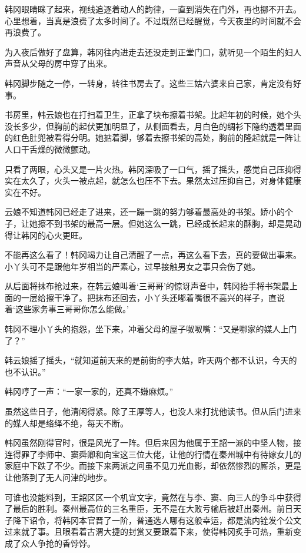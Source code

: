 韩冈眼睛眯了起来，视线追逐着动人的韵律，一直到消失在门外，再也挪不开去。心里想着，当真是浪费了太多时间了。不过既然已经醒觉，今天夜里的时间就不会再浪费了。

为入夜后做好了盘算，韩冈往内进走去还没走到正堂门口，就听见一个陌生的妇人声音从父母的房中穿了出来。

韩冈脚步随之一停，一转身，转往书房去了。这些三姑六婆来自己家，肯定没有好事。

书房里，韩云娘也在打扫着卫生，正拿了块布擦着书架。比起年初的时候，她个头没长多少，但胸前的起伏更加明显了，从侧面看去，月白色的绸衫下隐约透着里面的红色肚兜被看得分明。她掂着脚，够着去擦书架的高处，胸前的隆起就是一阵让人口干舌燥的微微颤动。

只看了两眼，心头又是一片火热。韩冈深吸了一口气，摇了摇头，感觉自己压抑得实在太久了，火头一被点起，就怎么也压不下去。果然太过压抑自己，对身体健康实在不好。

云娘不知道韩冈已经走了进来，还一蹦一跳的努力够着最高处的书架。娇小的个子，让她擦不到书架的最高一层。但她这么一跳，已经成长起来的酥胸，却是晃动得让韩冈的心火更旺。

不能再这么看了！韩冈竭力让自己清醒了一点，再这么看下去，真的要做出事来。小丫头可不是跟他年岁相当的严素心，过早接触男女之事只会伤了她。

从后面将抹布抢过来，在韩云娘叫着‘三哥哥’的惊讶声音中，韩冈抬手将书架最上面的一层给擦干净了。把抹布还回去，小丫头还嘟着嘴很不高兴的样子，直说着‘这些家务事三哥哥你怎么能做。’

韩冈不理小丫头的抱怨，坐下来，冲着父母的屋子呶呶嘴：“又是哪家的媒人上门了？”

韩云娘摇了摇头，“就知道前天来的是前街的李大姑，昨天两个都不认识，今天的也不认识。”

韩冈哼了一声：“一家一家的，还真不嫌麻烦。”

虽然这些日子，他清闲得紧。除了王厚等人，也没人来打扰他读书。但从后门进来的媒人却是络绎不绝，每天不断。

韩冈虽然刚得官时，很是风光了一阵。但后来因为他属于王韶一派的中坚人物，接连得罪了李师中、窦舜卿和向宝这三位大佬，让他的行情在秦州城中有待嫁女儿的家庭中下跌了不少。而接下来两派之间虽不见刀光血影，却依然惨烈的厮杀，更是让他落到了无人问津的地步。

可谁也没能料到，王韶区区一个机宜文字，竟然在与李、窦、向三人的争斗中获得了最后的胜利。秦州最高位的三名重臣，无不是在大败亏输后被赶出秦州。前日天子降下诏令，将韩冈本官晋了一阶，普通选人哪有这般幸运，都是流内铨发个公文过来就了事。且眼看着古渭大捷的封赏又要跟着下来，使得韩冈炙手可热，重新变成了众人争抢的香饽饽。

